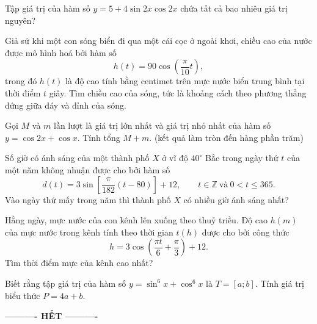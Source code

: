 \documentclass[12pt,a4paper]{article}
\begin{document}
\begin{questions}[start=1,itemsep=8pt,topsep=5pt]
  \item Tập giá trị của hàm số $y=5+4\sin 2x\cos 2x$ chứa tất cả bao nhiêu giá trị nguyên?

  \item Giả sử khi một con sóng biển đi qua một cái cọc ở ngoài khơi, chiều cao của nước được mô hình hoá bởi hàm số
  \[
    h(t)=90\cos\left(\dfrac{\pi}{10}t\right),
  \]
  trong đó $h(t)$ là độ cao tính bằng centimet trên mực nước biển trung bình tại thời điểm $t$ giây. Tìm chiều cao của sóng, tức là khoảng cách theo phương thẳng đứng giữa đáy và đỉnh của sóng.

  \item Gọi $M$ và $m$ lần lượt là giá trị lớn nhất và giá trị nhỏ nhất của hàm số $y=\cos 2x+\cos x$. Tính tổng $M+m$. (kết quả làm tròn đến hàng phần trăm)

  \item Số giờ có ánh sáng của một thành phố $X$ ở vĩ độ $40^\circ$ Bắc trong ngày thứ $t$ của một năm không nhuận được cho bởi hàm số
  \[
    d(t)=3\sin\left[\dfrac{\pi}{182}(t-80)\right]+12,
    \qquad t\in\mathbb{Z}\ \text{và}\ 0<t\le365.
  \]
  Vào ngày thứ mấy trong năm thì thành phố $X$ có nhiều giờ ánh sáng nhất?

  \item Hằng ngày, mực nước của con kênh lên xuống theo thuỷ triều. Độ cao $h(m)$ của mực nước trong kênh tính theo thời gian $t(h)$ được cho bởi công thức
  \[
    h=3\cos\left(\dfrac{\pi t}{6}+\dfrac{\pi}{3}\right)+12.
  \]
  Tìm thời điểm mực của kênh cao nhất?

  \item Biết rằng tập giá trị của hàm số $y=\sin^6x+\cos^6x$ là $T=[a;b]$. Tính giá trị biểu thức $P=4a+b$.
\end{questions}

\vspace{6mm}
\begin{center}
  \textbf{---------- HẾT ----------}
\end{center}
\end{document}

